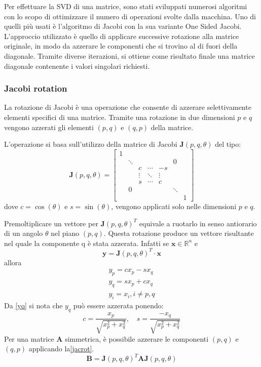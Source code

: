 \label{sec:OneSidedJacobi}
Per effettuare la SVD di una matrice, sono stati sviluppati numerosi algoritmi con lo scopo di ottimizzare il numero di operazioni svolte dalla macchina.
Uno di quelli più usati è l'algoritmo di Jacobi con la sua variante One Sided Jacobi. L'approccio utilizzato è quello di applicare successive rotazione alla matrice originale, in modo da azzerare le componenti che si trovino al di fuori della diagonale. Tramite diverse iterazioni, si ottiene come risultato finale una matrice diagonale contenente i valori singolari richiesti.
\subsubsection{Jacobi rotation}
\label{sec:Jacobi_rotation}
La rotazione di Jacobi è una operazione che consente di azzerare selettivamente elementi specifici di una matrice. Tramite una rotazione in due dimensioni $p$ e $q$ vengono azzerati gli elementi $(p,q)$ e $(q,p)$ della matrice.

L'operazione si basa sull'utilizzo della matrice di Jacobi $\mathbf{J}(p,q,\theta)$ del tipo:
\begin{equation}
\mathbf{J}(p,q,\theta)=\begin{bmatrix}
1 &  &  &  &  &  & \\
& \ddots &  &  &  & 0 & \\
&  & c & \cdots & -s &  & \\
&  & \vdots & \ddots & \vdots &  & \\
&  & s & \cdots & c &  & \\
& 0 &  &  &  & \ddots & \\
&  &  &  &  &  & 1
\end{bmatrix}
\end{equation}
dove $c=\cos(\theta)$ e $s=\sin(\theta)$, vengono applicati solo nelle dimensioni $p$ e $q$.

Premoltiplicare un vettore per $\mathbf{J}(p,q,\theta)^T$ equivale a ruotarlo in senso antiorario di un angolo $\theta$ nel piano $(p,q)$. Questa rotazione produce un vettore risultante nel quale la componente q è stata azzerata. Infatti se $\mathbf{x}\in\mathbb{R}^{n}$ e
\begin{equation}
\mathbf{y}=\mathbf{J}(p,q,\theta)^T	\cdot \mathbf{x}
\end{equation}
allora
\begin{eqnarray}
y_p=cx_p-sx_q\\
y_q=sx_p+cx_q\label{yq}\\
y_i=x_i, i\neq p,q
\end{eqnarray}
Da \eqref{yq} si nota che $y_q$ può essere azzerata ponendo:
\begin{equation}
c=\frac{x_p}{\sqrt{x_p^2+x_q^2}},\quad s=\frac{-x_q}{\sqrt{x_p^2+x_q^2}}
\end{equation}
Per una matrice $\mathbf{A}$ simmetrica, è possibile azzerare le componenti $(p,q)$ e $(q,p)$ applicando la\eqref{jacrot}.
\begin{equation}\label{jacrot}
\mathbf{B}=\mathbf{J}(p,q,\theta)^T\mathbf{A}\mathbf{J}(p,q,\theta)
\end{equation}

